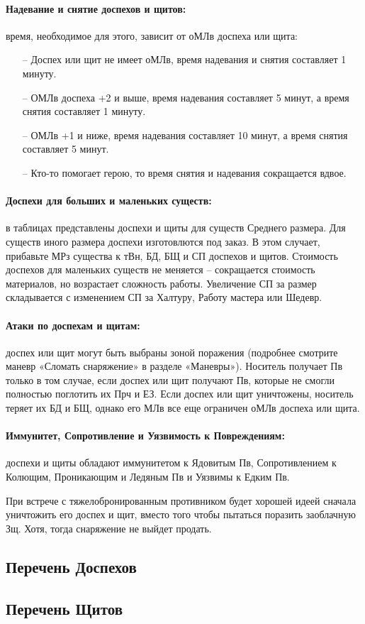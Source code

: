 \paragraph{Надевание и снятие доспехов и щитов:} время, необходимое для этого, зависит от оМЛв доспеха или щита:
\begin{itemize}
    \item[--] Доспех или щит не имеет оМЛв, время надевания и снятия составляет 1 минуту.
    \item[--] ОМЛв доспеха +2 и выше, время надевания составляет 5 минут, а время снятия составляет 1 минуту.
    \item[--] ОМЛв +1 и ниже, время надевания составляет 10 минут, а время снятия составляет 5 минут.
    \item[--] Кто-то помогает герою, то время снятия и надевания сокращается вдвое.
\end{itemize}
\paragraph{Доспехи для больших и маленьких существ:} в таблицах представлены доспехи и щиты для существ Среднего размера. Для существ иного размера доспехи изготовлются под заказ. 
\newline В этом случает, прибавьте МРз существа к тВн, БД, БЩ и СП доспехов и щитов. Стоимость доспехов для маленьких существ не меняется – сокращается стоимость материалов, но возрастает сложность работы. Увеличение СП за размер складывается с изменением СП за Халтуру, Работу мастера или Шедевр.
\paragraph{Атаки по доспехам и щитам:} доспех или щит могут быть выбраны зоной поражения (подробнее смотрите маневр «Сломать снаряжение» в разделе «Маневры»). Носитель получает Пв только в том случае, если доспех или щит получают Пв, которые не смогли полностью поглотить их Прч и ЕЗ.
\newline Если доспех или щит уничтожены, носитель теряет их БД и БЩ, однако его МЛв все еще ограничен оМЛв доспеха или щита.
\paragraph{Иммунитет, Сопротивление и Уязвимость к Повреждениям:} доспехи и щиты обладают иммунитетом к Ядовитым Пв, Сопротивлением к Колющим, Проникающим и Ледяным Пв и Уязвимы к Едким Пв. 
\begin{tcolorbox}
    При встрече с тяжелобронированным противником будет хорошей идеей сначала уничтожить его доспех и щит, вместо того чтобы пытаться поразить заоблачную Зщ. Хотя, тогда снаряжение не выйдет продать. 
\end{tcolorbox}

\subsection{Перечень Доспехов}

\subsection{Перечень Щитов}


